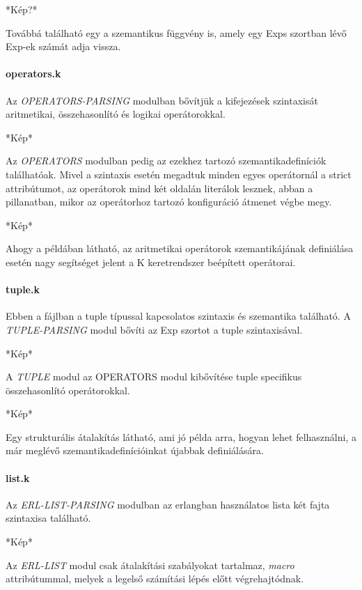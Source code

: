 \documentclass[twoside, a4paper, 12pt]{article}
\begin{document}
*Kép?*

Továbbá található egy a szemantikus függvény is, amely egy Exps szortban lévő Exp-ek számát adja vissza.

\paragraph{operators.k}
Az \textit{OPERATORS-PARSING} modulban bővítjük a kifejezések szintaxisát aritmetikai, összehasonlító és logikai operátorokkal.

*Kép*

Az \textit{OPERATORS} modulban pedig az ezekhez tartozó szemantikadefiníciók találhatóak. Mivel a szintaxis esetén megadtuk minden egyes operátornál a strict attribútumot, az operátorok mind két oldalán literálok lesznek, abban a pillanatban, mikor az operátorhoz tartozó konfiguráció átmenet végbe megy.

*Kép*

Ahogy a példában látható, az aritmetikai operátorok szemantikájának definiálása esetén nagy segítséget jelent a K keretrendszer beépített operátorai.

\paragraph{tuple.k}
Ebben a fájlban a tuple típussal kapcsolatos szintaxis és szemantika található. A \textit{TUPLE-PARSING} modul bővíti az Exp szortot a tuple szintaxisával.

*Kép*

A \textit{TUPLE} modul az OPERATORS modul kibővítése tuple specifikus összehasonlító operátorokkal.

*Kép*

Egy strukturális átalakítás látható, ami jó példa arra, hogyan lehet felhasználni, a már meglévő szemantikadefinícióinkat újabbak definiálására.


\paragraph{list.k}

Az \textit{ERL-LIST-PARSING} modulban az erlangban használatos lista két fajta szintaxisa található.

*Kép*

Az \textit{ERL-LIST} modul csak átalakítási szabályokat tartalmaz, \textit{macro} attribútummal, melyek a legelső számítási lépés előtt végrehajtódnak.
\end{document}
